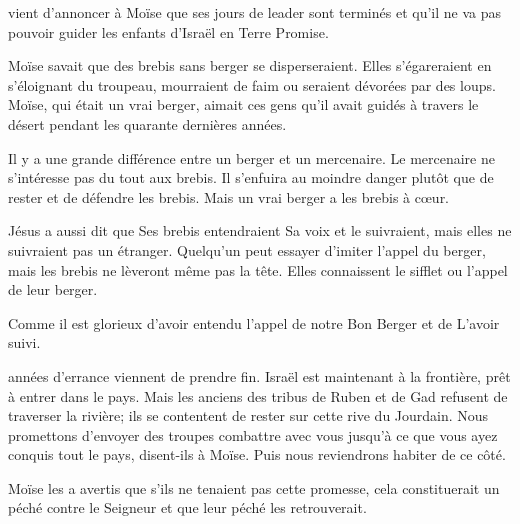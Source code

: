  vient d'annoncer à Moïse que ses jours de leader
 sont terminés et qu'il ne va pas pouvoir guider les enfants d'Israël
 en Terre Promise.

Moïse savait que des brebis sans berger se disperseraient.
 Elles s'égareraient en s'éloignant du troupeau,
 mourraient de faim ou seraient dévorées par des loups.
 Moïse, qui était un vrai berger,
 aimait ces gens qu'il avait guidés à travers le désert
 pendant les quarante dernières années.

Il y a une grande différence entre un berger et un mercenaire.
 Le mercenaire ne s'intéresse pas du tout aux brebis.
 Il s'enfuira au moindre danger plutôt que de rester et de défendre les brebis.
 Mais un vrai berger a les brebis à cœur.


Jésus a aussi dit que Ses brebis entendraient Sa voix et le suivraient,
 mais elles ne suivraient pas un étranger.
 Quelqu'un peut essayer d'imiter l'appel du berger,
 mais les brebis ne lèveront même pas la tête.
 Elles connaissent le sifflet ou l'appel de leur berger.

Comme il est glorieux d'avoir entendu l'appel de notre Bon Berger
 et de L'avoir suivi. 

\dvrule






 années d'errance viennent de prendre fin.
 Israël est maintenant à la frontière, prêt à entrer dans le pays.
 Mais les anciens des tribus de Ruben et de Gad
 refusent de traverser la rivière;
 ils se contentent de rester sur cette rive du Jourdain.
 \og Nous promettons d'envoyer des troupes combattre avec vous
 jusqu'à ce que vous ayez conquis tout le pays, \fg{} disent-ils à Moïse.
 \og Puis nous reviendrons habiter de ce côté. \fg{}

Moïse les a avertis que s'ils ne tenaient pas cette promesse,
 cela constituerait un péché contre le Seigneur
 \ocadr{}et que leur péché les retrouverait.

